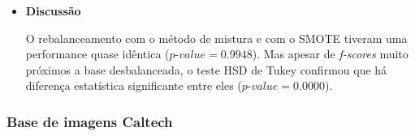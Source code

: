 \begin{itemize}
\item[] \textbf{Discussão}

O rebalanceamento com o método de mistura e com o SMOTE tiveram uma performance quase idêntica ($\textit{p-value} = 0.9948$). Mas apesar de \textit{f-scores} muito próximos a base desbalanceada, o teste HSD de Tukey confirmou que há diferença estatística significante entre eles ($\textit{p-value} =0.0000$).

\end{itemize}

\subsubsection{Base de imagens Caltech}

